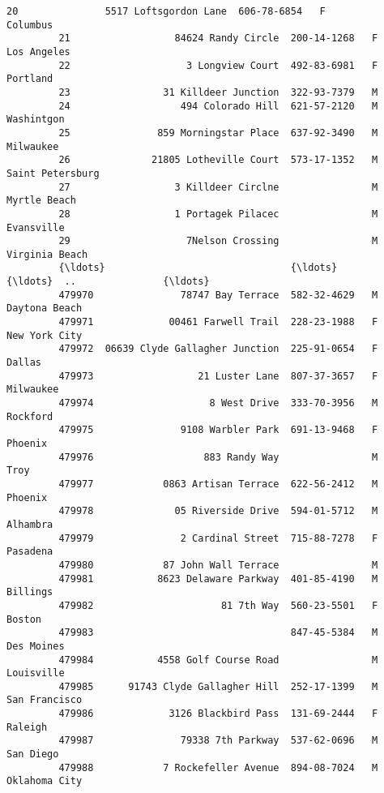 \documentclass[11pt]{article}
\begin{document}
\begin{Verbatim}[commandchars=\\\{\}]
         20               5517 Loftsgordon Lane  606-78-6854   F          Columbus   
         21                  84624 Randy Circle  200-14-1268   F       Los Angeles   
         22                    3 Longview Court  492-83-6981   F          Portland   
         23                31 Killdeer Junction  322-93-7379   M                     
         24                   494 Colorado Hill  621-57-2120   M        Washintgon   
         25               859 Morningstar Place  637-92-3490   M         Milwaukee   
         26              21805 Lotheville Court  573-17-1352   M  Saint Petersburg   
         27                  3 Killdeer Circlne                M      Myrtle Beach   
         28                  1 Portagek Pilacec                M        Evansville   
         29                    7Nelson Crossing                M    Virginia Beach   
         {\ldots}                                {\ldots}          {\ldots}  ..               {\ldots}   
         479970               78747 Bay Terrace  582-32-4629   M     Daytona Beach   
         479971             00461 Farwell Trail  228-23-1988   F     New York City   
         479972  06639 Clyde Gallagher Junction  225-91-0654   F            Dallas   
         479973                  21 Luster Lane  807-37-3657   F         Milwaukee   
         479974                    8 West Drive  333-70-3956   M          Rockford   
         479975               9108 Warbler Park  691-13-9468   F           Phoenix   
         479976                   883 Randy Way                M              Troy   
         479977            0863 Artisan Terrace  622-56-2412   M           Phoenix   
         479978              05 Riverside Drive  594-01-5712   M          Alhambra   
         479979               2 Cardinal Street  715-88-7278   F          Pasadena   
         479980            87 John Wall Terrace                M                     
         479981           8623 Delaware Parkway  401-85-4190   M          Billings   
         479982                      81 7th Way  560-23-5501   F            Boston   
         479983                                  847-45-5384   M        Des Moines   
         479984           4558 Golf Course Road                M        Louisville   
         479985      91743 Clyde Gallagher Hill  252-17-1399   M     San Francisco   
         479986             3126 Blackbird Pass  131-69-2444   F           Raleigh   
         479987               79338 7th Parkway  537-62-0696   M         San Diego   
         479988            7 Rockefeller Avenue  894-08-7024   M     Oklahoma City   

\end{Verbatim}
\end{document}
